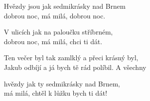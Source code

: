 
\nv{}Hvězdy jsou jak sedmikrásky nad Brnem\\
dobrou noc, má milá, dobrou noc. \nc{}\nc{}
\vspace{15pt}

\nv V ulicích jak na paloučku stříbrném,\\
dobrou noc, má milá, chci ti dát.
\vspace{15pt}

\nv Ten večer byl tak zamlklý a přeci krásný byl,\\
Jakub odbíjí a já bych tě rád políbil. A všechny
\vspace{15pt}

\nv hvězdy jak ty sedmikrásky nad Brnem,\\
má milá, chtěl k lůžku bych ti dát!
\newpage

